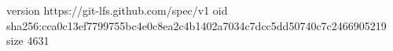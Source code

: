version https://git-lfs.github.com/spec/v1
oid sha256:cca0c13ef7799755bc4e0c8ea2c4b1402a7034c7dcc5dd50740c7c2466905219
size 4631
